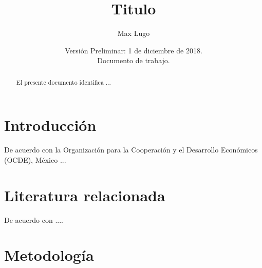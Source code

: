 \documentclass[11pt]{article}
\begin{document}



    
\title{\textbf{\huge Titulo}}
\author{Max Lugo}
\date{Versión Preliminar: 1 de diciembre de 2018. \\Documento de trabajo. \\ \textbf{} }
\maketitle

\begin{abstract}\label{abstract}
\noindent El presente documento identifica ...
\end{abstract}


\bigskip



\thispagestyle{empty}
\pagebreak \pagebreak

\newpage
\tableofcontents %
\setcounter{secnumdepth}{3} %
\setcounter{tocdepth}{4} %
\setcounter{page}{1}





\newpage

\section{Introducción}


\noindent De acuerdo con la Organización para la Cooperación y el Desarrollo Económicos (OCDE), México ...



\section{Literatura relacionada}

De acuerdo con \cite{Glewwe2008} ....



\section{Metodología}
\end{document}

